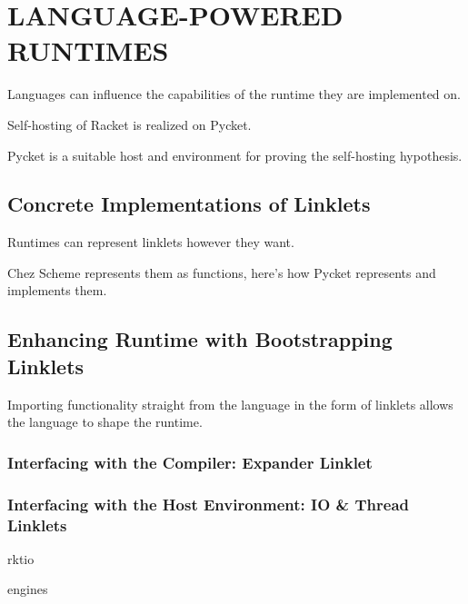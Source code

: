 \chapter[\texorpdfstring{LANGUAGE-POWERED RUNTIMES}
                          {Self-hosting Pycket}]{LANGUAGE-POWERED RUNTIMES}
	\label{chapter:pycket}

	\begin{chaptersynopsis}
		Languages can influence the capabilities of the runtime they are implemented on.

		Self-hosting of Racket is realized on Pycket.

	\end{chaptersynopsis}

	\begin{paragraph-here}
		Pycket is a suitable host and environment for proving the self-hosting hypothesis.
	\end{paragraph-here}

	\section{Concrete Implementations of Linklets}

		\begin{mainpoint}
			Runtimes can represent linklets however they want.

			Chez Scheme represents them as functions, here's how Pycket represents and implements them.
		\end{mainpoint}

	\section{Enhancing Runtime with Bootstrapping Linklets}
		\begin{mainpoint}
			Importing functionality straight from the language in the form of linklets allows the language to shape the runtime.
		\end{mainpoint}
		\subsection{Interfacing with the Compiler: Expander Linklet}

		\subsection{Interfacing with the Host Environment: IO \& Thread Linklets}
			\begin{todo}[TODO]
				rktio
			\end{todo}
			\begin{todo}[TODO]
				engines
			\end{todo}
